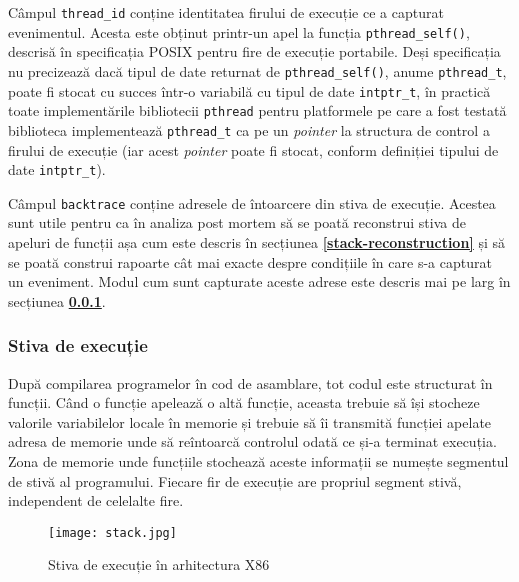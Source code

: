 Câmpul \lstinline{thread_id} conține identitatea firului de execuție ce
a capturat evenimentul. Acesta este obținut printr-un apel la funcția
\lstinline{pthread_self()}, descrisă în specificația POSIX pentru fire
de execuție portabile\cite{pthread}. Deși specificația nu precizează
dacă tipul de date returnat de \lstinline{pthread_self()}, anume
\lstinline{pthread_t}, poate fi stocat cu succes într-o variabilă cu
tipul de date \lstinline{intptr_t}, în practică toate implementările
bibliotecii \lstinline{pthread} pentru platformele pe care a fost
testată biblioteca implementează \lstinline{pthread_t} ca pe un
\textit{pointer} la structura de control a firului de execuție (iar
acest \textit{pointer} poate fi stocat, conform definiției tipului de
date \lstinline{intptr_t}).

Câmpul \lstinline{backtrace} conține adresele de întoarcere din stiva de
execuție. Acestea sunt utile pentru ca în analiza post mortem să se
poată reconstrui stiva de apeluri de funcții așa cum este descris în
secțiunea \textbf{\ref{stack-reconstruction}} și să se poată construi
rapoarte cât mai exacte despre condițiile în care s-a capturat un
eveniment. Modul cum sunt capturate aceste adrese este descris mai pe
larg în secțiunea \textbf{\ref{stack-unwinding}}.

\subsubsection{Stiva de execuție}\label{stack-unwinding}

După compilarea programelor în cod de asamblare, tot codul este
structurat în funcții. Când o funcție apelează o altă funcție, aceasta
trebuie să își stocheze valorile variabilelor locale în memorie și
trebuie să îi transmită funcției apelate adresa de memorie unde să
reîntoarcă controlul odată ce și-a terminat execuția. Zona de memorie
unde funcțiile stochează aceste informații se numește segmentul de stivă
al programului. Fiecare fir de execuție are propriul segment stivă,
independent de celelalte fire.

\begin{figure}[ht]
\centering
\texttt{[image: stack.jpg]}
\caption{Stiva de execuție în arhitectura X86}
\label{fig:stack}
\end{figure}

